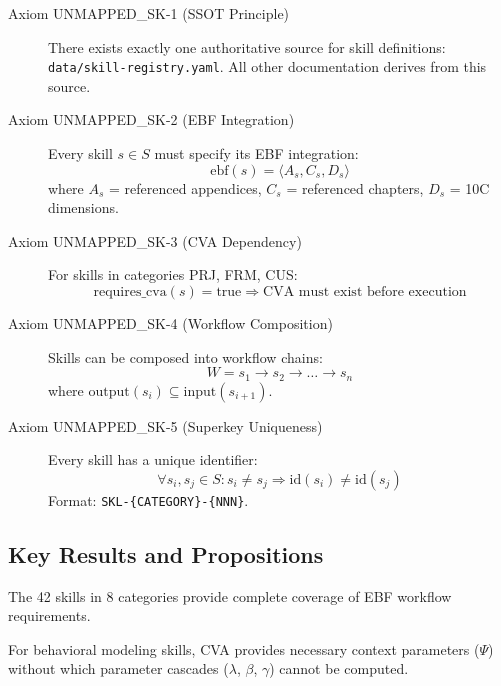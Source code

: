 \begin{description}
\item[Axiom UNMAPPED_SK-1 (SSOT Principle)] There exists exactly one authoritative source for skill definitions:
\texttt{data/skill-registry.yaml}. All other documentation derives from this source.

\item[Axiom UNMAPPED_SK-2 (EBF Integration)] Every skill $s \in S$ must specify its EBF integration:
\[
\text{ebf}(s) = \langle A_s, C_s, D_s \rangle
\]
where $A_s$ = referenced appendices, $C_s$ = referenced chapters, $D_s$ = 10C dimensions.

\item[Axiom UNMAPPED_SK-3 (CVA Dependency)] For skills in categories PRJ, FRM, CUS:
\[
\text{requires\_cva}(s) = \text{true} \Rightarrow \text{CVA must exist before execution}
\]

\item[Axiom UNMAPPED_SK-4 (Workflow Composition)] Skills can be composed into workflow chains:
\[
W = s_1 \rightarrow s_2 \rightarrow \ldots \rightarrow s_n
\]
where $\text{output}(s_i) \subseteq \text{input}(s_{i+1})$.

\item[Axiom UNMAPPED_SK-5 (Superkey Uniqueness)] Every skill has a unique identifier:
\[
\forall s_i, s_j \in S: s_i \neq s_j \Rightarrow \text{id}(s_i) \neq \text{id}(s_j)
\]
Format: \texttt{SKL-\{CATEGORY\}-\{NNN\}}.
\end{description}


\subsection{Key Results and Propositions}
\label{sec:sk-results}

\begin{proposition}
The 42 skills in 8 categories provide complete coverage of EBF workflow requirements.
\end{proposition}

\begin{proposition}
For behavioral modeling skills, CVA provides necessary context parameters ($\Psi$) without which
parameter cascades ($\lambda$, $\beta$, $\gamma$) cannot be computed.
\end{proposition}

